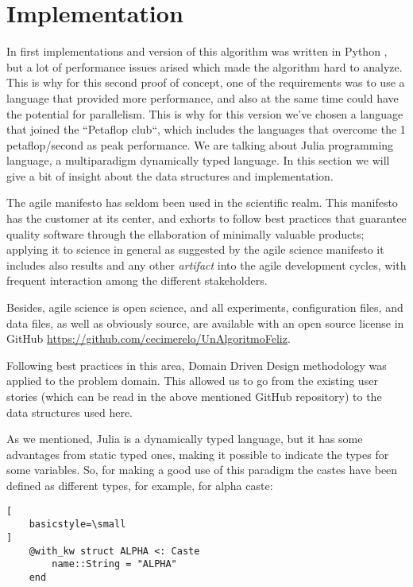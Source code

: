 \section{Implementation}
\label{sec:implementation}

In first implementations and version of this algorithm was written in Python
\cite{merelo_molina_2021}, but a lot of performance issues arised which made the
algorithm hard to analyze. This is why for this second proof of concept, one of
the requirements was to use a language that provided more performance, and also
at the same time could have the potential for parallelism. This is why for this
version we've chosen a language that joined the ``Petaflop club``, which
includes the languages that overcome the 1 petaflop/second as peak
performance. We are talking about Julia \cite{julia} programming language, a
multiparadigm dynamically typed language. In this section we will give a bit of
insight about the data structures and implementation.

The agile manifesto has seldom been used in the scientific realm. This manifesto
has the customer at its center, and exhorts to follow best practices that
guarantee quality software through the ellaboration of minimally valuable
products; applying it to science in general as suggested by the agile science
manifesto \cite{agile_manifesto} it includes also results and any other {\em
  artifact} into the agile development cycles, with frequent interaction among
the different stakeholders.

Besides, agile science is open science, and all experiments, configuration
files, and data files, as well as obviously source, are available with an open
source license in GitHub \url{https://github.com/cecimerelo/UnAlgoritmoFeliz}.

Following best practices in this area, Domain Driven Design
\cite{evans2004domain} methodology was
applied to the problem domain. This allowed us to go from the existing user
stories (which can be read in the above mentioned GitHub repository) to the data
structures used here.

As we mentioned, Julia is a dynamically typed language, but it has some
advantages from static typed ones, making it possible to indicate the types for
some variables. So, for making a good use of this paradigm the castes have been
defined as different types, for example, for alpha caste:

\begin{lstlisting}[
    basicstyle=\small
]
    @with_kw struct ALPHA <: Caste
        name::String = "ALPHA"
    end
\end{lstlisting}

